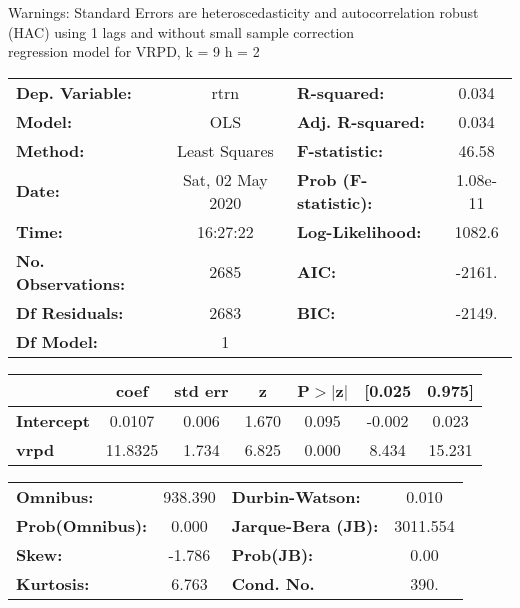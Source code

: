 Warnings: \newline
 [1] Standard Errors are heteroscedasticity and autocorrelation robust (HAC) using 1 lags and without small sample correction\\ 

regression model for VRPD, k = 9 h = 2\begin{center}
\begin{tabular}{lclc}
\toprule
\textbf{Dep. Variable:}    &       rtrn       & \textbf{  R-squared:         } &     0.034   \\
\textbf{Model:}            &       OLS        & \textbf{  Adj. R-squared:    } &     0.034   \\
\textbf{Method:}           &  Least Squares   & \textbf{  F-statistic:       } &     46.58   \\
\textbf{Date:}             & Sat, 02 May 2020 & \textbf{  Prob (F-statistic):} &  1.08e-11   \\
\textbf{Time:}             &     16:27:22     & \textbf{  Log-Likelihood:    } &    1082.6   \\
\textbf{No. Observations:} &        2685      & \textbf{  AIC:               } &    -2161.   \\
\textbf{Df Residuals:}     &        2683      & \textbf{  BIC:               } &    -2149.   \\
\textbf{Df Model:}         &           1      & \textbf{                     } &             \\
\bottomrule
\end{tabular}
\begin{tabular}{lcccccc}
                   & \textbf{coef} & \textbf{std err} & \textbf{z} & \textbf{P$> |$z$|$} & \textbf{[0.025} & \textbf{0.975]}  \\
\midrule
\textbf{Intercept} &       0.0107  &        0.006     &     1.670  &         0.095        &       -0.002    &        0.023     \\
\textbf{vrpd}      &      11.8325  &        1.734     &     6.825  &         0.000        &        8.434    &       15.231     \\
\bottomrule
\end{tabular}
\begin{tabular}{lclc}
\textbf{Omnibus:}       & 938.390 & \textbf{  Durbin-Watson:     } &    0.010  \\
\textbf{Prob(Omnibus):} &   0.000 & \textbf{  Jarque-Bera (JB):  } & 3011.554  \\
\textbf{Skew:}          &  -1.786 & \textbf{  Prob(JB):          } &     0.00  \\
\textbf{Kurtosis:}      &   6.763 & \textbf{  Cond. No.          } &     390.  \\
\bottomrule
\end{tabular}
\end{center}

